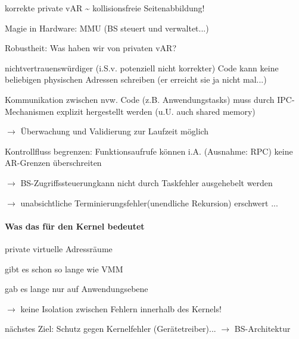 \documentclass[a4paper]{article}
\newcommand{\cmark}{\ding{51}}
\begin{document}
\begin{multicols}{3}
    \begin{itemize*}
        \item
        korrekte private vAR \textasciitilde{} kollisionsfreie
        Seitenabbildung!
        \item
        Magie in Hardware: MMU (BS steuert und verwaltet...)
        \item
        Robustheit: Was haben wir von privaten vAR?
        \begin{itemize*}
            \item \cmark nichtvertrauenswürdiger (i.S.v. potenziell nicht korrekter) Code kann keine beliebigen physischen Adressen schreiben (er erreicht sie ja nicht mal...)
            \item \cmark Kommunikation zwischen nvw. Code (z.B. Anwendungstasks) muss durch IPC-Mechanismen explizit hergestellt werden (u.U. auch shared memory) \begin{itemize*} \item $\rightarrow$ Überwachung und Validierung zur Laufzeit möglich \end{itemize*}
            \item \cmark Kontrollfluss begrenzen: Funktionsaufrufe können i.A. (Ausnahme: RPC) keine AR-Grenzen überschreiten \begin{itemize*} \item $\rightarrow$ BS-Zugriffssteuerungkann nicht durch Taskfehler ausgehebelt werden \item $\rightarrow$ unabsichtliche Terminierungsfehler(unendliche Rekursion) erschwert ... \end{itemize*}
        \end{itemize*}
    \end{itemize*}


    \paragraph{Was das für den Kernel
        bedeutet}

    \begin{itemize*}
        \item
        private virtuelle Adressräume
        \begin{itemize*}
            \item gibt es schon so lange wie VMM
            \item gab es lange nur auf Anwendungsebene
            \item $\rightarrow$ keine Isolation zwischen Fehlern innerhalb des Kernels!
        \end{itemize*}
        \item
        nächstes Ziel: Schutz gegen Kernelfehler (Gerätetreiber)...
        $\rightarrow$ BS-Architektur
    \end{itemize*}



\end{multicols}
\end{document}
